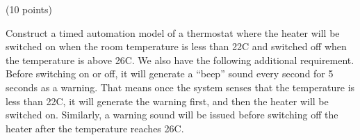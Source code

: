 \documentclass[a4paper,12pt]{article}
\begin{document}
\begin{problem}{}
(10 points) 

\smallskip
\noindent
Construct a timed automation model of a thermostat where the heater will be switched on when the room temperature is less than 22C and switched off when the temperature is above 26C. We also have the following additional requirement. Before switching on or off, it will generate a ``beep'' sound every second for 5 seconds as a warning. That means once the system senses that the temperature is less than 22C, it will generate the warning first, and then the heater will be switched on. Similarly, a warning sound will be issued before switching off the heater after the temperature reaches 26C.
\\
\\
\begin{minipage}{1\textwidth}
        \rectangle{\linewidth}{20cm}
\end{minipage}
\newpage
\ \\
\begin{minipage}{1\textwidth}
        \rectangle{\linewidth}{24cm}
\end{minipage}
\newpage
\ \\
\begin{minipage}{1\textwidth}
		\rectangle{\linewidth}{24cm}
\end{minipage}
\newpage
\ \\
\begin{minipage}{1\textwidth}
        \rectangle{\linewidth}{24cm}
\end{minipage}
\end{problem}

\newpage
\end{document}
